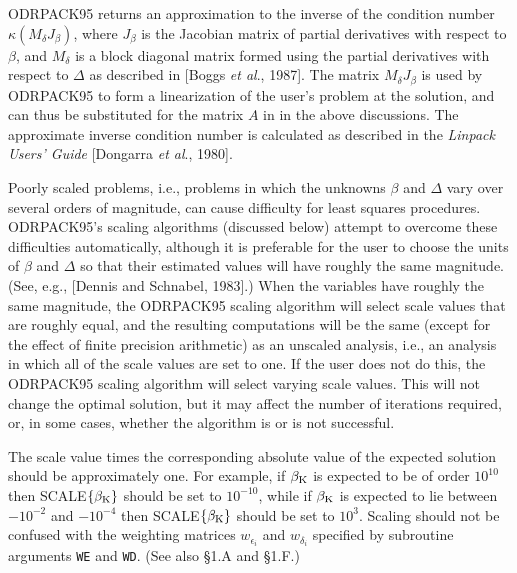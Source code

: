 \noindent ODRPACK95 returns an approximation to the inverse of the condition
number $\kappa(M_\delta J_\beta)$, where $J_\beta$ is the Jacobian matrix of
partial derivatives with respect to $\beta$, and $M_\delta$ is a block diagonal
matrix formed using the partial derivatives with respect to $\Delta$ as
described in [Boggs {\it et al}., 1987]. The matrix $M_\delta J_\beta$ is used
by ODRPACK95 to form a linearization of the user's problem at the solution, and can thus be substituted for the matrix $A$ in in the above discussions. The approximate inverse condition number is calculated as described in the {\it Linpack Users' Guide} [Dongarra {\it et al}., 1980].

\bigskip{}\medskip

\noindent Poorly scaled problems, i.e., problems in which the unknowns $\beta$
and $\Delta$ vary over several orders of magnitude, can cause difficulty for
least squares procedures. ODRPACK95's scaling algorithms (discussed below)
attempt to overcome these difficulties automatically, although it is preferable
for the user to choose the units of $\beta$ and $\Delta$ so that their estimated
values will have roughly the same magnitude. (See, e.g., [Dennis and Schnabel,
1983].) When the variables have roughly the same magnitude, the ODRPACK95
scaling algorithm will select scale values that are roughly equal, and the
resulting computations will be the same (except for the effect of finite
precision arithmetic) as an unscaled analysis, i.e., an analysis in which all of
the scale values are set to one. If the user does not do this, the ODRPACK95 scaling algorithm will select varying scale values. This will not change the optimal solution, but it may affect the number of iterations required, or, in some cases, whether the algorithm is or is not successful.

\noindent The scale value times the corresponding absolute value of the expected solution should be approximately one. For example, if $\beta_{\rm K}$ is expected to be of order $10^{10}$ then {\smallcaps SCALE}$\{\beta_{\rm K}\}$ should be set to $10^{-10}$, while if $\beta_{\rm K}$ is expected to lie between
$-10^{-2}$ and $-10^{-4}$ then {\smallcaps SCALE}$\{\beta_{\rm K}\}$ should be set to $10^3$. Scaling should not be confused with the weighting matrices $w_{\epsilon_i}$ and $w_{\delta_i}$ specified by subroutine arguments {\tt WE} and {\tt WD}. (See also \S 1.A and \S 1.F.)

\medskip

